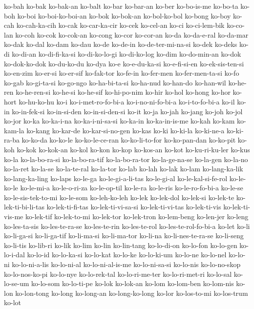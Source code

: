 {ko-bah ko-bak ko-bak-an ko-balt ko-bar ko-bar-an ko-ber ko-bo-is-me
ko-bo-ta ko-boh ko-boi ko-boi-ko-boi-an ko-bok ko-bok-an ko-bol-ko-bol
ko-bong ko-boy ko-cah ko-cah-ka-cih ko-cak ko-car-ka-cir ko-cek ko-cel-an
ko-ci ko-ci-lem-bik ko-co-lan ko-coh ko-cok ko-cok-an ko-cong ko-cor
ko-cor-an ko-da ko-da-e-ral ko-da-mar ko-dak ko-dal ko-dam ko-dau ko-de
ko-de-in ko-de-ter-mi-na-si ko-dek ko-deks ko-di ko-di-an ko-di-fi-ka-si
ko-di-ko-lo-gi ko-di-ko-log ko-dim ko-do-min-an ko-dok ko-dok-ko-dok
ko-du-ko-du ko-dya ko-e ko-e-du-ka-si ko-e-fi-si-en ko-ek-sis-ten-si
ko-en-zim ko-er-si ko-er-sif ko-fak-tor ko-fe-in ko-fer-men
ko-fer-men-ta-si ko-fo ko-gab ko-gi-ta-si ko-go-ngo ko-ha-bi-ta-si
ko-ha-nud ko-han-do ko-han-wil ko-he-ren ko-he-ren-si ko-he-si ko-he-sif
ko-hi-po-nim ko-hir ko-hol ko-hong ko-hor ko-hort ko-hu-ko-hu ko-i
ko-i-met-ro-fo-bi-a ko-i-no-ni-fo-bi-a ko-i-to-fo-bi-a ko-il ko-in
ko-in-fek-si ko-in-si-den ko-in-si-den-si ko-it ko-ja ko-jah ko-jang
ko-joh ko-jol ko-jor ko-ka ko-ka-i-na ko-ka-i-ni-sa-si ko-ka-in
ko-ka-in-is-me ko-kah ko-kam ko-kam-la ko-kang ko-kar-de ko-kar-si-no-gen
ko-kas ko-ki ko-ki-la ko-ki-ne-a ko-ki-ra-ba ko-ko-da ko-ko-le
ko-ko-le-ce-ran ko-ko-li-to-for ko-ko-pan-dan ko-ko-pit ko-koh ko-kok
ko-kok-an ko-kol ko-kon ko-kop ko-kos-an ko-kot ko-ku-ri-ku-ler ko-kus
ko-la ko-la-bo-ra-si ko-la-bo-ra-tif ko-la-bo-ra-tor ko-la-ge-na-se
ko-la-gen ko-la-no ko-la-ret ko-la-se ko-la-te-ral ko-la-tor ko-lab ko-lah
ko-lak ko-lam ko-lang-ka-lik ko-lang-ka-ling ko-laps ko-le-ga
ko-le-gi-a-li-tas ko-le-gi-al ko-le-kal-si-fe-rol ko-le-ko-le ko-le-mi-a
ko-le-o-ri-za ko-le-op-til ko-le-ra ko-le-ris ko-le-ro-fo-bi-a ko-le-se
ko-le-sis-tek-to-mi ko-le-som ko-leh-ko-leh ko-lek ko-lek-dol ko-lek-si
ko-lek-te ko-lek-ti-bi-li-tas ko-lek-ti-fi-tas ko-lek-ti-vi-sa-si
ko-lek-ti-vi-tas ko-lek-ti-vis ko-lek-ti-vis-me ko-lek-tif ko-lek-to-mi
ko-lek-tor ko-lek-tron ko-lem-beng ko-len-jer ko-leng ko-les-ta-sis
ko-les-te-ra-se ko-les-te-rin ko-les-te-rol ko-les-te-rol-fo-bi-a ko-let
ko-li ko-li-ga-si ko-li-ga-tif ko-li-ma-si ko-li-ma-tor ko-li-na
ko-li-nes-te-ra-se ko-li-seng ko-li-tis ko-lib-ri ko-lik ko-lim ko-lin
ko-lin-tang ko-lo-di-on ko-lo-fon ko-lo-gen ko-lo-i-dal ko-lo-id
ko-lo-ka-si ko-lo-kat ko-lo-ke ko-lo-ki-um ko-lo-ne ko-lo-nel ko-lo-ni
ko-lo-ni-a-lis ko-lo-ni-al ko-lo-ni-al-is-me ko-lo-ni-sa-si ko-lo-nis
ko-lo-no-skop ko-lo-nos-ko-pi ko-lo-nye ko-lo-rek-tal ko-lo-ri-me-ter
ko-lo-ri-met-ri ko-lo-sal ko-lo-se-um ko-lo-som ko-lo-ti-pe ko-lok
ko-lok-an ko-lom ko-lom-ben ko-lom-nis ko-lon ko-lon-tong ko-long
ko-long-an ko-long-ko-long ko-lor ko-los-to-mi ko-los-trum ko-lot
}
